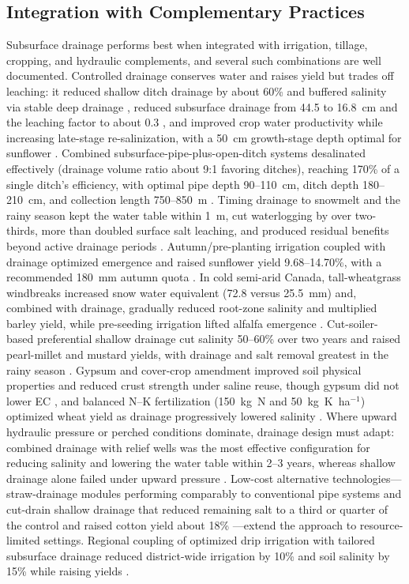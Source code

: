 \documentclass[11pt]{article}
\begin{document}
\subsection{Integration with Complementary Practices}

Subsurface drainage performs best when integrated with irrigation, tillage, cropping, and hydraulic complements, and several such combinations are well documented. Controlled drainage conserves water and raises yield but trades off leaching: it reduced shallow ditch drainage by about 60\% and buffered salinity via stable deep drainage \parencite{Jia2007}, reduced subsurface drainage from 44.5 to 16.8~cm and the leaching factor to about 0.3 \parencite{Jia2007}, and improved crop water productivity while increasing late-stage re-salinization, with a 50~cm growth-stage depth optimal for sunflower \parencite{Dou2022}. Combined subsurface-pipe-plus-open-ditch systems desalinated effectively (drainage volume ratio about 9:1 favoring ditches), reaching 170\% of a single ditch's efficiency, with optimal pipe depth 90--110~cm, ditch depth 180--210~cm, and collection length 750--850~m \parencite{Yao2024}. Timing drainage to snowmelt and the rainy season kept the water table within 1~m, cut waterlogging by over two-thirds, more than doubled surface salt leaching, and produced residual benefits beyond active drainage periods \parencite{Yu2016}. Autumn/pre-planting irrigation coupled with drainage optimized emergence and raised sunflower yield 9.68--14.70\%, with a recommended 180~mm autumn quota \parencite{Liu2023,Liu2025c}. In cold semi-arid Canada, tall-wheatgrass windbreaks increased snow water equivalent (72.8 versus 25.5~mm) and, combined with drainage, gradually reduced root-zone salinity and multiplied barley yield, while pre-seeding irrigation lifted alfalfa emergence \parencite{Steppuhn2006,Steppuhn2017}. Cut-soiler-based preferential shallow drainage cut salinity 50--60\% over two years and raised pearl-millet and mustard yields, with drainage and salt removal greatest in the rainy season \parencite{Neha2022,Neha2022b}. Gypsum and cover-crop amendment improved soil physical properties and reduced crust strength under saline reuse, though gypsum did not lower EC \parencite{MANN1982,Mitchell2000}, and balanced N--K fertilization (150~kg~N and 50~kg~K~ha$^{-1}$) optimized wheat yield as drainage progressively lowered salinity \parencite{Singh2001b}. Where upward hydraulic pressure or perched conditions dominate, drainage design must adapt: combined drainage with relief wells was the most effective configuration for reducing salinity and lowering the water table within 2--3 years, whereas shallow drainage alone failed under upward pressure \parencite{Benyamini2005,Mirlas2003}. Low-cost alternative technologies---straw-drainage modules performing comparably to conventional pipe systems \parencite{Lu2019} and cut-drain shallow drainage that reduced remaining salt to a third or quarter of the control and raised cotton yield about 18\% \parencite{Okuda2020}---extend the approach to resource-limited settings. Regional coupling of optimized drip irrigation with tailored subsurface drainage reduced district-wide irrigation by 10\% and soil salinity by 15\% while raising yields \parencite{Liu2026}.
\end{document}
